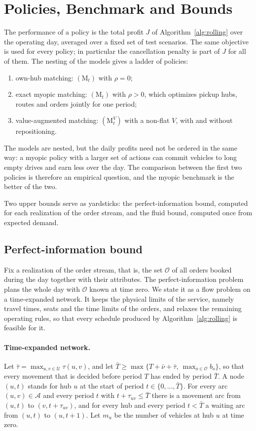 \documentclass[12pt]{article}
\theoremstyle{plain}
\theoremstyle{definition}
\begin{document}
\section{Policies, Benchmark and Bounds}\label{sec:eval}

The performance of a policy is the total profit $J$ of Algorithm~\ref{alg:rolling} over the operating day, averaged over a fixed set of test scenarios. The same objective is used for every policy; in particular the cancellation penalty is part of $J$ for all of them. The nesting of the models gives a ladder of policies:
\begin{enumerate}
    \item own-hub matching: $(\mathrm{M}_t)$ with $\rho=0$;
    \item exact myopic matching: $(\mathrm{M}_t)$ with $\rho>0$, which optimizes pickup hubs, routes and orders jointly for one period;
    \item value-augmented matching: $(\mathrm{M}^V_t)$ with a non-flat $V$, with and without repositioning.
\end{enumerate}
The models are nested, but the daily profits need not be ordered in the same way: a myopic policy with a larger set of actions can commit vehicles to long empty drives and earn less over the day. The comparison between the first two policies is therefore an empirical question, and the myopic benchmark is the better of the two.

Two upper bounds serve as yardsticks: the perfect-information bound, computed for each realization of the order stream, and the fluid bound, computed once from expected demand.

\subsection{Perfect-information bound}\label{sec:hindsight}

Fix a realization of the order stream, that is, the set $\mathcal{O}$ of all orders booked during the day together with their attributes. The perfect-information problem plans the whole day with $\mathcal{O}$ known at time zero. We state it as a flow problem on a time-expanded network. It keeps the physical limits of the service, namely travel times, seats and the time limits of the orders, and relaxes the remaining operating rules, so that every schedule produced by Algorithm~\ref{alg:rolling} is feasible for it.

\paragraph{Time-expanded network.} Let $\bar\tau=\max_{u,v\in\mathcal{U}}\tau(u,v)$, and let $\bar T\ge\max\{T+\bar\nu+\bar\tau,\ \max_{o\in\mathcal{O}}b_o\}$, so that every movement that is decided before period $T$ has ended by period $\bar T$. A node $(u,t)$ stands for hub $u$ at the start of period $t\in\{0,\dots,\bar T\}$. For every arc $(u,v)\in\mathcal{A}$ and every period $t$ with $t+\tau_{uv}\le\bar T$ there is a movement arc from $(u,t)$ to $(v,t+\tau_{uv})$, and for every hub and every period $t<\bar T$ a waiting arc from $(u,t)$ to $(u,t+1)$. Let $m_u$ be the number of vehicles at hub $u$ at time zero.
\end{document}
